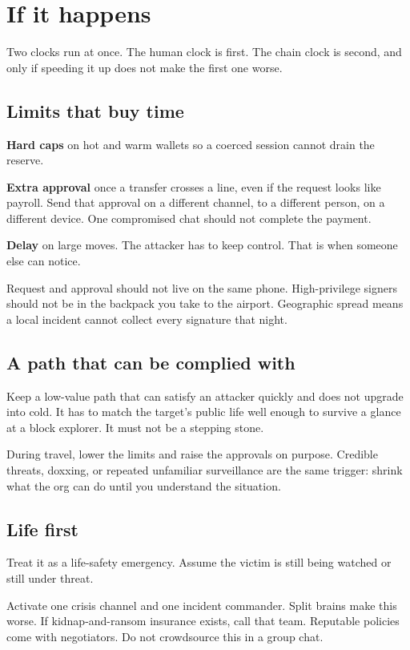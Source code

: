\chapter{If it happens}

Two clocks run at once. The human clock is first. The
chain clock is second, and only if speeding it up does
not make the first one worse.

\section{Limits that buy time}

\textbf{Hard caps} on hot and warm wallets so a coerced
session cannot drain the reserve.

\textbf{Extra approval} once a transfer crosses a line,
even if the request looks like payroll. Send that
approval on a different channel, to a different person,
on a different device. One compromised chat should not
complete the payment.

\textbf{Delay} on large moves. The attacker has to keep
control. That is when someone else can notice.

Request and approval should not live on the same phone.
High-privilege signers should not be in the backpack you
take to the airport. Geographic spread means a local
incident cannot collect every signature that night.

\section{A path that can be complied with}

Keep a low-value path that can satisfy an attacker
quickly and does not upgrade into cold. It has to match
the target's public life well enough to survive a glance
at a block explorer. It must not be a stepping stone.

During travel, lower the limits and raise the approvals
on purpose. Credible threats, doxxing, or repeated
unfamiliar surveillance are the same trigger: shrink what
the org can do until you understand the situation.

\section{Life first}

Treat it as a life-safety emergency. Assume the victim
is still being watched or still under threat.

Activate one crisis channel and one incident commander.
Split brains make this worse. If kidnap-and-ransom
insurance exists, call that team. Reputable policies
come with negotiators. Do not crowdsource this in a
group chat.

